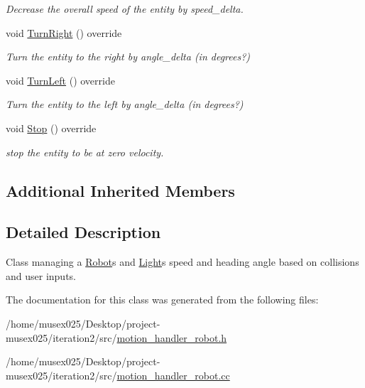 \begin{DoxyCompactItemize}
\begin{DoxyCompactList}\small\item\em Decrease the overall speed of the entity by speed\+\_\+delta. \end{DoxyCompactList}\item 
void \hyperlink{classMotionHandlerRobot_a4b18204b7c7f7f8a3cbb7f0e8ccf088f}{Turn\+Right} () override\hypertarget{classMotionHandlerRobot_a4b18204b7c7f7f8a3cbb7f0e8ccf088f}{}\label{classMotionHandlerRobot_a4b18204b7c7f7f8a3cbb7f0e8ccf088f}

\begin{DoxyCompactList}\small\item\em Turn the entity to the right by angle\+\_\+delta (in degrees?) \end{DoxyCompactList}\item 
void \hyperlink{classMotionHandlerRobot_a955ca2693c4188ffb08cfde469e58252}{Turn\+Left} () override\hypertarget{classMotionHandlerRobot_a955ca2693c4188ffb08cfde469e58252}{}\label{classMotionHandlerRobot_a955ca2693c4188ffb08cfde469e58252}

\begin{DoxyCompactList}\small\item\em Turn the entity to the left by angle\+\_\+delta (in degrees?) \end{DoxyCompactList}\item 
void \hyperlink{classMotionHandlerRobot_a735287a2ab240ae0655def3afb0839f1}{Stop} () override\hypertarget{classMotionHandlerRobot_a735287a2ab240ae0655def3afb0839f1}{}\label{classMotionHandlerRobot_a735287a2ab240ae0655def3afb0839f1}

\begin{DoxyCompactList}\small\item\em stop the entity to be at zero velocity. \end{DoxyCompactList}\end{DoxyCompactItemize}
\subsection*{Additional Inherited Members}


\subsection{Detailed Description}
Class managing a \hyperlink{classRobot}{Robot}\textquotesingle{}s and \hyperlink{classLight}{Light}\textquotesingle{}s speed and heading angle based on collisions and user inputs. 

The documentation for this class was generated from the following files\+:\begin{DoxyCompactItemize}
\item 
/home/musex025/\+Desktop/project-\/musex025/iteration2/src/\hyperlink{motion__handler__robot_8h}{motion\+\_\+handler\+\_\+robot.\+h}\item 
/home/musex025/\+Desktop/project-\/musex025/iteration2/src/\hyperlink{motion__handler__robot_8cc}{motion\+\_\+handler\+\_\+robot.\+cc}\end{DoxyCompactItemize}
